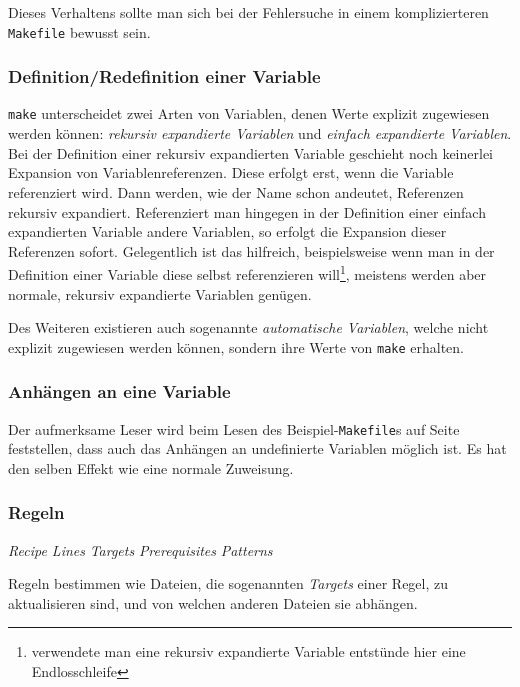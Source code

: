 	Dieses Verhaltens sollte man sich bei der Fehlersuche in einem
	komplizierteren \texttt{Makefile} bewusst sein.
%
\subsubsection*{Definition/Redefinition einer Variable}


	\texttt{make} unterscheidet zwei Arten von Variablen, denen Werte
	explizit zugewiesen werden können: \emph{rekursiv expandierte Variablen}
	und \emph{einfach expandierte Variablen}.
	Bei der Definition einer rekursiv expandierten Variable geschieht noch
	keinerlei Expansion von Variablenreferenzen. Diese erfolgt erst, wenn
	die Variable referenziert wird. Dann werden, wie der Name schon
	andeutet, Referenzen rekursiv expandiert.
	Referenziert man hingegen in der Definition einer einfach expandierten
	Variable andere Variablen, so erfolgt die Expansion dieser Referenzen
	sofort. Gelegentlich ist das hilfreich, beispielsweise wenn man in der
	Definition einer Variable diese selbst referenzieren
	will\footnote{verwendete man eine rekursiv expandierte Variable
	entstünde hier eine Endlosschleife}, meistens werden aber normale,
	rekursiv expandierte Variablen genügen.
	
	Des Weiteren existieren auch sogenannte \emph{automatische Variablen},
	welche nicht explizit zugewiesen werden können, sondern ihre Werte von
	\texttt{make} erhalten.
%
\subsubsection*{Anhängen an eine Variable}

	
	Der aufmerksame Leser wird beim Lesen des Beispiel-\texttt{Makefile}s
	auf Seite~\pageref{subsubsection:examplemakefile} feststellen, dass
	auch das Anhängen an undefinierte Variablen möglich ist. Es hat den
	selben Effekt wie eine normale Zuweisung.

\subsubsection*{Regeln}
	
	\textit{Recipe Lines} 
	\textit{Targets} 
	\textit{Prerequisites} 
	\textit{Patterns} 

	Regeln bestimmen wie Dateien, die sogenannten \emph{Targets} einer
	Regel, zu aktualisieren sind, und von welchen anderen Dateien sie abhängen.
	
